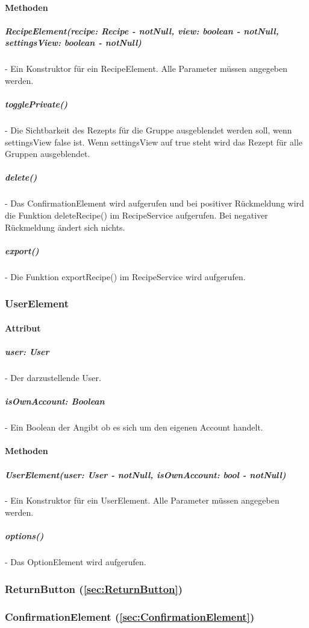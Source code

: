 \documentclass[parskip=full]{scrartcl}
\begin{document}
        \paragraph*{Methoden}
            \subparagraph*{RecipeElement(recipe: Recipe - notNull, view: boolean - notNull, settingsView: boolean - notNull)} - Ein Konstruktor für ein RecipeElement. Alle Parameter müssen angegeben werden.
            \subparagraph*{togglePrivate()} - Die Sichtbarkeit des Rezepts für die Gruppe ausgeblendet werden soll, wenn settingsView false ist. Wenn settingsView auf true steht wird das Rezept für alle Gruppen ausgeblendet.
            \subparagraph*{delete()} - Das ConfirmationElement wird aufgerufen und bei positiver Rückmeldung wird die Funktion deleteRecipe() im RecipeService aufgerufen. Bei negativer Rückmeldung ändert sich nichts.
            \subparagraph*{export()} - Die Funktion exportRecipe() im RecipeService wird aufgerufen.

    \subsubsection{UserElement} 
        \paragraph*{Attribut}

            \subparagraph*{user: User} - Der darzustellende User.
            \subparagraph*{isOwnAccount: Boolean} - Ein Boolean der Angibt ob es sich um den eigenen Account handelt.

        \paragraph*{Methoden}
            \subparagraph*{UserElement(user: User - notNull, isOwnAccount: bool - notNull)} - Ein Konstruktor für ein UserElement. Alle Parameter müssen angegeben werden.
            \subparagraph*{options()} - Das OptionElement wird aufgerufen.

        \subsubsection*{ReturnButton (\autoref{sec:ReturnButton})}

        \subsubsection*{ConfirmationElement (\autoref{sec:ConfirmationElement})}
\end{document}
